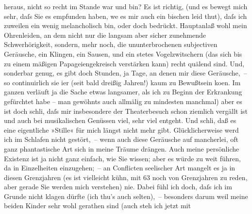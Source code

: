 \begin{ledgroupsized}[t]{13cm}
               heraus, nicht so recht im Stande war und bin? Es ist richtig, (und es bewegt mich
               sehr, daſs Sie es empfunden haben, we{\geminationn} es mir auch ein
               bischen leid thut), daſs ich {\pb}zuweilen ein wenig
               melancholisch bin, oder doch bedrückt. Hauptanlaß wohl mein Ohrenleiden, an dem nicht
               nur die langsam aber sicher zunehmende Schwerhörigkeit, sondern, mehr noch, die
               ununterbrochenen subjectiven Geräusche, ein Klingen, ein Sausen, und ein \strikeout{\textcolor{gray}{nicht}} stetes Vogelzwitschern (das sich bis zu einem mäßigen Papageiengekreisch
               verstärken kann) recht quälend sind. Und, sonderbar genug, es gibt doch Stunden, ja
               Tage, an denen mir diese Geräusche, – so continuirlich sie i{\geminationm}er (seit bald dreißig Jahren!) kaum zu Bewußtsein ko{\geminationm}en. Im ganzen verläuft ja die Sache etwas langsamer,
               als ich zu Beginn der Erkrankung gefürchtet habe – man gewöhnts auch allmälig \label{T_L02444_1v}\label{T_L02444_1h}zu mindesten manchmal) aber es ist doch schli{\geminationm}, daſs mir insbesondere der Theaterbesuch schon
               ziemlich vergällt ist und auch bei musikalischen Genüssen viel, sehr viel entgeht.
               Und schli{\geminationm}, {\pb}daß es
               eine eigentliche »Stille« für mich längst nicht mehr gibt. Glücklicherweise werd ich
               im Schlafen nicht gestört, – wenn auch diese Geräusche auf mancherlei, oft ganz
               phantastische Art sich in meine Träume drängen.\pend
           \pstart
           Auch meine persönliche Existenz ist ja nicht ganz einfach, wie Sie wissen; aber es
               würde zu weit führen, da in Einzelheiten einzugehen; – an Conflicten seelischer Art
               mangelt es ja in diesen Grenzjahren (es ist vielleicht kühn, mit 63 noch von
               Grenzjahren zu reden, aber gerade Sie werden mich verstehen) nie.\pend
           \pstart
           Dabei fühl ich doch, daſs ich im Grunde nicht klagen dürfte (ich thu’s auch
               selten), – besonders darum weil meine beiden Kinder sehr wohl gerathen sind (auch steh ich jetzt mit

\end{ledgroupsized}
